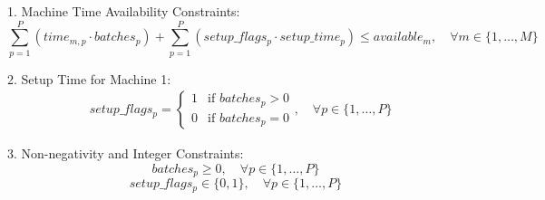 \documentclass{article}
\begin{document}
1. Machine Time Availability Constraints:
\[
\sum_{p=1}^{P} (time_{m,p} \cdot batches_{p}) + \sum_{p=1}^{P} (setup\_flags_{p} \cdot setup\_time_{p}) \leq available_{m}, \quad \forall m \in \{1, \ldots, M\}
\]

2. Setup Time for Machine 1:
\[
\begin{aligned}
&setup\_flags_{p} = \begin{cases} 
1 & \text{if } batches_{p} > 0 \\
0 & \text{if } batches_{p} = 0 
\end{cases}, \quad \forall p \in \{1, \ldots, P\}
\end{aligned}
\]

3. Non-negativity and Integer Constraints:
\[
batches_{p} \geq 0, \quad \forall p \in \{1, \ldots, P\}
\]
\[
setup\_flags_{p} \in \{0, 1\}, \quad \forall p \in \{1, \ldots, P\}
\]
\end{document}
